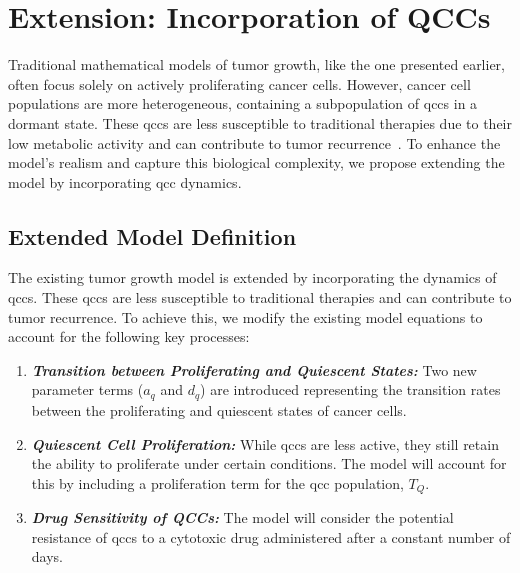 \chapter{Extension: Incorporation of QCCs}

Traditional mathematical models of tumor growth, like the one presented earlier, often focus solely on actively proliferating cancer cells. However, cancer cell populations are more heterogeneous, containing a subpopulation of \gls{qcc}s in a dormant state. These \gls{qcc}s are less susceptible to traditional therapies due to their low metabolic activity and can contribute to tumor recurrence~\cite{Davis2019}. To enhance the model's realism and capture this biological complexity, we propose extending the model by incorporating \gls{qcc} dynamics.

\section{Extended Model Definition}

The existing tumor growth model is extended by incorporating the dynamics of \gls{qcc}s. These \gls{qcc}s are less susceptible to traditional therapies and can contribute to tumor recurrence. To achieve this, we modify the existing model equations to account for the following key processes:

\begin{enumerate}
    \item \textbf{\textit{Transition between Proliferating and Quiescent States:}} Two new parameter terms ($a_q$ and $d_q$) are introduced representing the transition rates between the proliferating and quiescent states of cancer cells.
    
    \item \textbf{\textit{Quiescent Cell Proliferation:}}  While \gls{qcc}s are less active, they still retain the ability to proliferate under certain conditions. The model will account for this by including a proliferation term for the \gls{qcc} population, $T_Q$.
    
    \item \textbf{\textit{Drug Sensitivity of QCCs:}} The model will consider the potential resistance of \gls{qcc}s to a cytotoxic drug administered after a constant number of days.
\end{enumerate}

